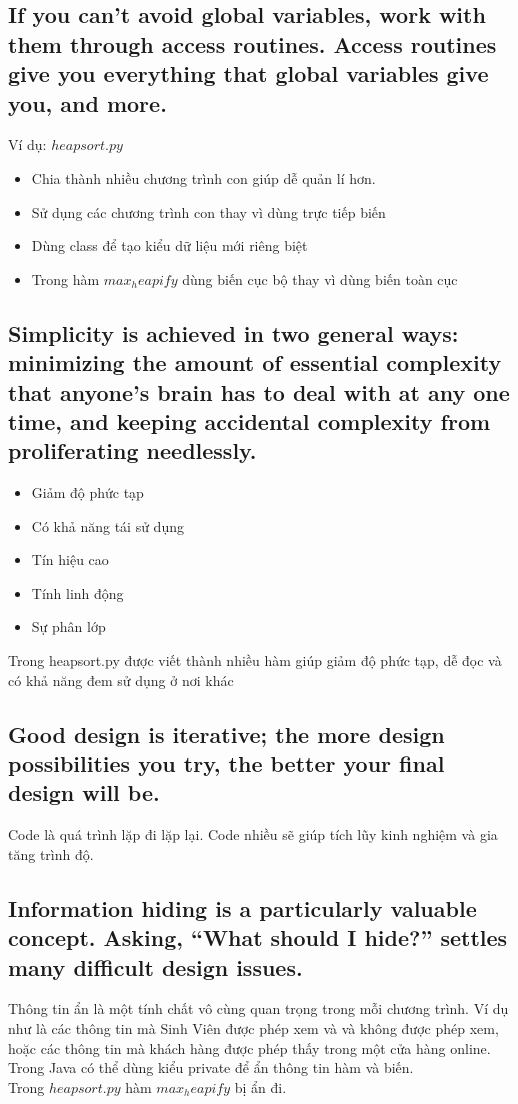\documentclass{article}
\begin{document}
    \subsection{If you can't avoid global variables, work with them through access routines. Access routines give you everything that global variables give you, and more.}
    
    Ví dụ: $heapsort.py$
    \begin{itemize}
        \item Chia thành nhiều chương trình con giúp dễ  quản lí hơn.
        \item Sử dụng các chương trình con thay vì dùng trực tiếp biến
        \item Dùng class để tạo kiểu dữ liệu mới riêng biệt
        \item Trong hàm $max_heapify$ dùng biến cục bộ thay vì dùng biến toàn cục
    \end{itemize}
    
    \subsection{Simplicity is achieved in two general ways: minimizing the amount of essential complexity that anyone's brain has to deal with at any one time, and keeping accidental complexity from proliferating needlessly.}
    \begin{itemize}
        \item Giảm độ phức tạp 
        \item Có khả năng tái sử dụng
        \item Tín hiệu cao
        \item Tính linh động
        \item Sự phân lớp 
    \end{itemize}
    Trong heapsort.py được viết thành nhiều hàm giúp giảm độ phức tạp, dễ đọc và có khả năng đem sử dụng ở nơi khác
    
    \subsection{Good design is iterative; the more design possibilities you try, the better your final design will be.}
    Code là quá trình lặp đi lặp lại. Code nhiều sẽ giúp tích lũy kinh nghiệm và gia tăng trình độ.
    
    \subsection{Information hiding is a particularly valuable concept. Asking, “What should I hide?” settles many difficult design issues.}
    Thông tin ẩn là một tính chất vô cùng quan trọng trong mỗi chương trình. Ví dụ như là các thông tin mà Sinh Viên được phép xem và và không được phép xem, hoặc các thông tin mà khách hàng được phép thấy trong một cửa hàng online.\\
    Trong Java có thể dùng kiểu private để ẩn thông tin hàm và biến.\\
    Trong $heapsort.py$ hàm $max_heapify$ bị ẩn đi.
\end{document}
